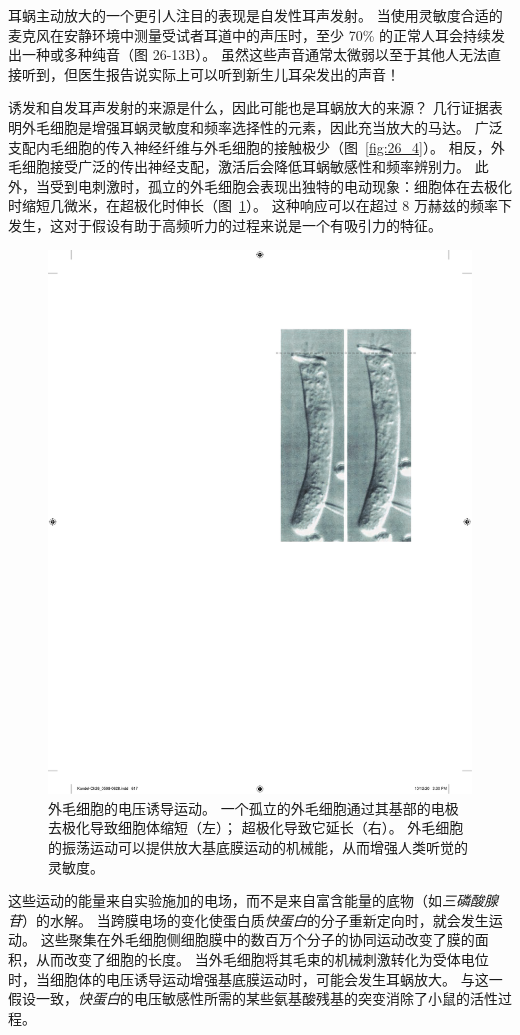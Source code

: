 耳蜗主动放大的一个更引人注目的表现是自发性耳声发射。
当使用灵敏度合适的麦克风在安静环境中测量受试者耳道中的声压时，至少 70\% 的正常人耳会持续发出一种或多种纯音（图 26-13B）。
虽然这些声音通常太微弱以至于其他人无法直接听到，但医生报告说实际上可以听到新生儿耳朵发出的声音！


诱发和自发耳声发射的来源是什么，因此可能也是耳蜗放大的来源？
几行证据表明外毛细胞是增强耳蜗灵敏度和频率选择性的元素，因此充当放大的马达。
广泛支配内毛细胞的传入神经纤维与外毛细胞的接触极少（图~\ref{fig:26_4}）。
相反，外毛细胞接受广泛的传出神经支配，激活后会降低耳蜗敏感性和频率辨别力。
此外，当受到电刺激时，孤立的外毛细胞会表现出独特的电动现象：细胞体在去极化时缩短几微米，在超极化时伸长（图~\ref{fig:26_14}）。
这种响应可以在超过 8 万赫兹的频率下发生，这对于假设有助于高频听力的过程来说是一个有吸引力的特征。


\begin{figure}[htbp]
	\centering
	\includegraphics[width=0.5\linewidth]{chap26/fig_26_14}
	\caption{外毛细胞的电压诱导运动。
		一个孤立的外毛细胞通过其基部的电极去极化导致细胞体缩短（左）； 
		超极化导致它延长（右）。
		外毛细胞的振荡运动可以提供放大基底膜运动的机械能，从而增强人类听觉的灵敏度。}
	\label{fig:26_14}
\end{figure}


这些运动的能量来自实验施加的电场，而不是来自富含能量的底物（如\textit{三磷酸腺苷}）的水解。
当跨膜电场的变化使蛋白质\textit{快蛋白}的分子重新定向时，就会发生运动。
这些聚集在外毛细胞侧细胞膜中的数百万个分子的协同运动改变了膜的面积，从而改变了细胞的长度。
当外毛细胞将其毛束的机械刺激转化为受体电位时，当细胞体的电压诱导运动增强基底膜运动时，可能会发生耳蜗放大。
与这一假设一致，\textit{快蛋白}的电压敏感性所需的某些氨基酸残基的突变消除了小鼠的活性过程。


